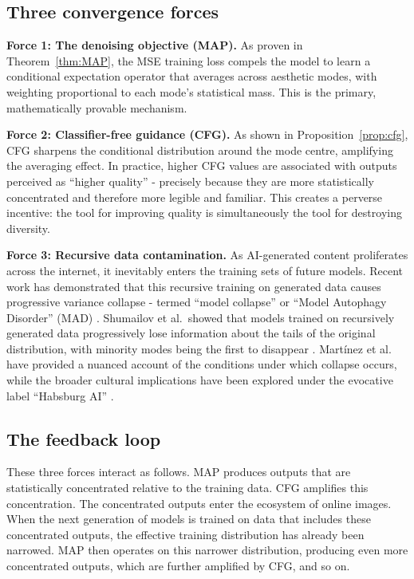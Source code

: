 \documentclass[11pt]{article}
\begin{document}
\subsection{Three convergence forces}

\textbf{Force 1: The denoising objective (MAP).} As proven in Theorem~\ref{thm:MAP}, the MSE training loss compels the model to learn a conditional expectation operator that averages across aesthetic modes, with weighting proportional to each mode's statistical mass. This is the primary, mathematically provable mechanism.

\textbf{Force 2: Classifier-free guidance (CFG).} As shown in Proposition~\ref{prop:cfg}, CFG sharpens the conditional distribution around the mode centre, amplifying the averaging effect. In practice, higher CFG values are associated with outputs perceived as ``higher quality'' - precisely because they are more statistically concentrated and therefore more legible and familiar. This creates a perverse incentive: the tool for improving quality is simultaneously the tool for destroying diversity.

\textbf{Force 3: Recursive data contamination.} As AI-generated content proliferates across the internet, it inevitably enters the training sets of future models. Recent work has demonstrated that this recursive training on generated data causes progressive variance collapse - termed ``model collapse'' \citep{Shumailov2024} or ``Model Autophagy Disorder'' (MAD) \citep{Alemohammad2023}. Shumailov et al.\ showed that models trained on recursively generated data progressively lose information about the tails of the original distribution, with minority modes being the first to disappear \citep{Shumailov2024}. Mart\'{i}nez et al.\ \citep{Schaeffer2025} have provided a nuanced account of the conditions under which collapse occurs, while the broader cultural implications have been explored under the evocative label ``Habsburg AI'' \citep{Sadowski2023}.

\subsection{The feedback loop}

These three forces interact as follows. MAP produces outputs that are statistically concentrated relative to the training data. CFG amplifies this concentration. The concentrated outputs enter the ecosystem of online images. When the next generation of models is trained on data that includes these concentrated outputs, the effective training distribution has already been narrowed. MAP then operates on this narrower distribution, producing even more concentrated outputs, which are further amplified by CFG, and so on.
\end{document}
